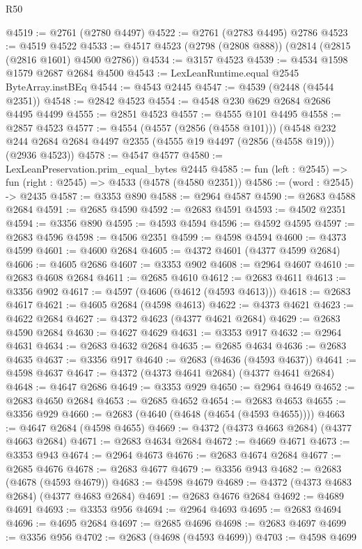 \begin{lexlean}{R50}
\begin{coremodule}
@4519 := @2761 (@2780 @4497)
@4522 := @2761 (@2783 @4495) @2786
@4523 := @4519 @4522
@4533 := @4517 @4523 (@2798 (@2808 @888)) (@2814 (@2815 (@2816 @1601) @4500 @2786))
@4534 := @3157 @4523
@4539 := @4534 @1598 @1579 @2687 @2684 @4500
@4543 := LexLeanRuntime.equal @2545 ByteArray.instBEq
@4544 := @4543 @2445
@4547 := @4539 (@2448 (@4544 @2351))
@4548 := @2842 @4523
@4554 := @4548 @230 @629 @2684 @2686 @4495 @4499
@4555 := @2851 @4523
@4557 := @4555 @101 @4495
@4558 := @2857 @4523
@4577 := @4554
    (@4557 (@2856 (@4558 @101)))
    (@4548 @232 @244 @2684 @2684 @4497 @2355 (@4555 @19 @4497 (@2856 (@4558 @19))) (@2936 @4523))
@4578 := @4547 @4577
@4580 := LexLeanPreservation.prim_equal_bytes @2445
@4585 := fun (left : @2545) => fun (right : @2545) => @4533 (@4578 (@4580 @2351))
@4586 := (word : @2545) -> @2435
@4587 := @3353 @890
@4588 := @2964 @4587
@4590 := @2683 @4588 @2684
@4591 := @2685 @4590
@4592 := @2683 @4591
@4593 := @4502 @2351
@4594 := @3356 @890
@4595 := @4593 @4594
@4596 := @4592 @4595
@4597 := @2683 @4596
@4598 := @4506 @2351
@4599 := @4598 @4594
@4600 := @4373 @4599
@4601 := @4600 @2684
@4605 := @4372 @4601 (@4377 @4599 @2684)
@4606 := @4605 @2686
@4607 := @3353 @902
@4608 := @2964 @4607
@4610 := @2683 @4608 @2684
@4611 := @2685 @4610
@4612 := @2683 @4611
@4613 := @3356 @902
@4617 := @4597 (@4606 (@4612 (@4593 @4613)))
@4618 := @2683 @4617
@4621 := @4605 @2684 (@4598 @4613)
@4622 := @4373 @4621
@4623 := @4622 @2684
@4627 := @4372 @4623 (@4377 @4621 @2684)
@4629 := @2683 @4590 @2684
@4630 := @4627 @4629
@4631 := @3353 @917
@4632 := @2964 @4631
@4634 := @2683 @4632 @2684
@4635 := @2685 @4634
@4636 := @2683 @4635
@4637 := @3356 @917
@4640 := @2683 (@4636 (@4593 @4637))
@4641 := @4598 @4637
@4647 := @4372 (@4373 @4641 @2684) (@4377 @4641 @2684)
@4648 := @4647 @2686
@4649 := @3353 @929
@4650 := @2964 @4649
@4652 := @2683 @4650 @2684
@4653 := @2685 @4652
@4654 := @2683 @4653
@4655 := @3356 @929
@4660 := @2683 (@4640 (@4648 (@4654 (@4593 @4655))))
@4663 := @4647 @2684 (@4598 @4655)
@4669 := @4372 (@4373 @4663 @2684) (@4377 @4663 @2684)
@4671 := @2683 @4634 @2684
@4672 := @4669 @4671
@4673 := @3353 @943
@4674 := @2964 @4673
@4676 := @2683 @4674 @2684
@4677 := @2685 @4676
@4678 := @2683 @4677
@4679 := @3356 @943
@4682 := @2683 (@4678 (@4593 @4679))
@4683 := @4598 @4679
@4689 := @4372 (@4373 @4683 @2684) (@4377 @4683 @2684)
@4691 := @2683 @4676 @2684
@4692 := @4689 @4691
@4693 := @3353 @956
@4694 := @2964 @4693
@4695 := @2683 @4694
@4696 := @4695 @2684
@4697 := @2685 @4696
@4698 := @2683 @4697
@4699 := @3356 @956
@4702 := @2683 (@4698 (@4593 @4699))
@4703 := @4598 @4699

\end{coremodule}
\end{lexlean}
